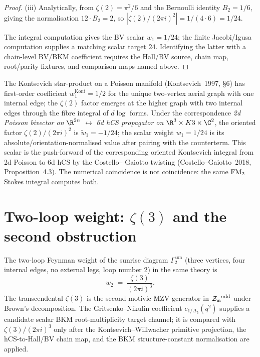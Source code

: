 \begin{proof}
(iii) Analytically, from $\zeta(2) = \pi^2/6$ and the Bernoulli identity
$B_2 = 1/6$, giving the normalisation $12\cdot B_2 = 2$, so
$|\zeta(2)/(2\pi i)^2| = 1/(4\cdot 6) = 1/24$.

The integral computation gives the BV scalar $w_1=1/24$; the finite
Jacobi/Igusa computation supplies a matching scalar target $24$.
Identifying the latter with a chain-level BV/BKM coefficient requires
the Hall/BV source, chain map, root/parity fixtures, and comparison
maps named above.
\end{proof}

\begin{remark}
\label{rem:kontsevich-star-one-loop}
The Kontsevich star-product on a Poisson manifold (Kontsevich~1997,
\S6) has first-order coefficient $w_1^{\mathrm{Kont}} = 1/2$ for the
unique two-vertex aerial graph with one internal edge; the $\zeta(2)$
factor emerges at the higher graph with two internal edges through the
fibre integral of $d\log$ forms. Under the correspondence
\emph{2d Poisson bivector on} $\R^{2n}$ $\leftrightarrow$ \emph{6d hCS
propagator on} $\R^3\times K3\times \C^2$, the oriented factor
\(\zeta(2)/(2\pi i)^2\) is \(\widetilde w_1=-1/24\); the scalar weight
\(w_1=1/24\) is its absolute/orientation-normalised value after pairing
with the counterterm. This scalar is the push-forward of the corresponding
oriented Kontsevich integral from 2d Poisson to 6d hCS by the Costello--
Gaiotto twisting (Costello--Gaiotto~2018, Proposition~4.3).
The numerical coincidence is not coincidence: the same
$\mathrm{FM}_2$ Stokes integral computes both.
\end{remark}

\section{Two-loop weight: $\zeta(3)$ and the second obstruction}
\label{sec:6d-hcs-two-loop}

\begin{theorem}
\label{thm:6d-hcs-two-loop-coefficient}
The two-loop Feynman weight of the sunrise diagram
$\Gamma_2^{\mathrm{sun}}$ (three vertices, four internal edges, no
external legs, loop number $2$) in the same theory is
\begin{equation}
\label{eq:two-loop-weight-main}
w_2 \;=\; \frac{\zeta(3)}{(2\pi i)^3}.
\end{equation}
The transcendental $\zeta(3)$ is the second motivic MZV generator in
${\mathcal{Z}_{\mathfrak m}}^{\mathrm{odd}}$ under Brown's decomposition. The
Gritsenko--Nikulin coefficient $c_{1/\Delta_5}(q^2)$ supplies a
candidate scalar BKM root-multiplicity target channel; it is compared with
$\zeta(3)/(2\pi i)^3$ only after the Kontsevich--Willwacher primitive
projection, the hCS-to-Hall/BV chain map, and the BKM structure-constant
normalisation are applied.
\end{theorem}

